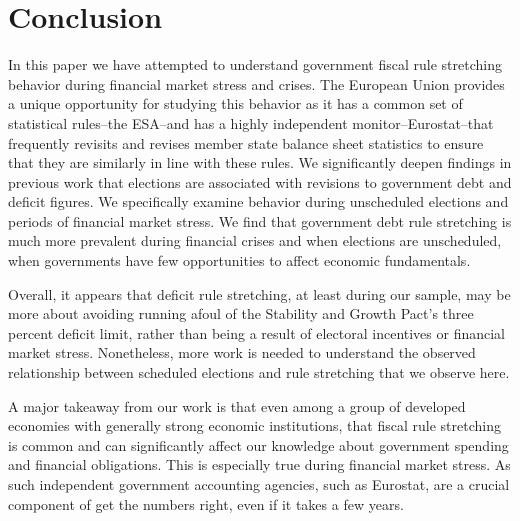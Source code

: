 \documentclass[]{article}
\begin{document}
\begin{landscape}
    
\end{landscape}


\section{Conclusion}

In this paper we have attempted to understand government fiscal rule stretching behavior during financial market stress and crises. The European Union provides a unique opportunity for studying this behavior as it has a common set of statistical rules--the ESA--and has a highly independent monitor--Eurostat--that frequently revisits and revises member state balance sheet statistics to ensure that they are similarly in line with these rules. We significantly deepen findings in previous work that elections are associated with revisions to government debt and deficit figures. We specifically examine behavior during unscheduled elections and periods of financial market stress. We find that government debt rule stretching is much more prevalent during financial crises and when elections are unscheduled, when governments have few opportunities to affect economic fundamentals.

Overall, it appears that deficit rule stretching, at least during our sample, may be more about avoiding running afoul of the Stability and Growth Pact's three percent deficit limit, rather than being a result of electoral incentives or financial market stress. Nonetheless, more work is needed to understand the observed relationship between scheduled elections and rule stretching that we observe here.

A major takeaway from our work is that even among a group of developed economies with generally strong economic institutions, that fiscal rule stretching is common and can significantly affect our knowledge about government spending and financial obligations. This is especially true during financial market stress. As such independent government accounting agencies, such as Eurostat, are a crucial component of get the numbers right, even if it takes a few years.


\clearpage




\pagebreak
\renewcommand{\thepage}{A-\arabic{page}}\setcounter{page}{1}
\renewcommand{\thesection}{Appendix \arabic{section}}\setcounter{section}{0}
\renewcommand{\thetable}{A-\arabic{table}}\setcounter{table}{0}
\renewcommand{\thefigure}{A-\arabic{figure}}\setcounter{figure}{0}
\clearpage
\end{document}
